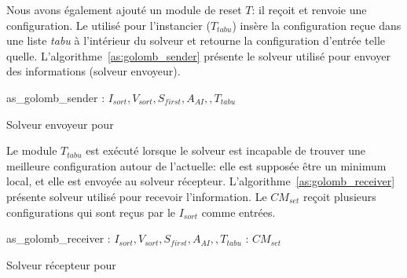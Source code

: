 Nous avons également ajouté un module de reset $T$: il reçoit et renvoie une configuration. Le \om{} utilisé pour l'instancier ($T_{tabu}$) insère la configuration reçue dans une liste \textit{tabu} à l'intérieur du solveur et retourne la configuration d'entrée telle quelle. L'algorithme~\ref{as:golomb_sender} présente le solveur utilisé pour envoyer des informations (solveur envoyeur).

\begin{algorithm}
\dontprintsemicolon
\SetNoline
{}
   as\_golomb\_sender\;
\algoindent{} : $I_{sort}, V_{sort}, S_{first}, A_{AI}, , T_{tabu}$ \; 
\caption{Solveur envoyeur pour  \GRP}\label{as:golomb_sender}
\end{algorithm}

Le module $T_{tabu}$ est exécuté lorsque le solveur est incapable de trouver une meilleure configuration autour de l'actuelle: elle est supposée être un minimum local, et elle est envoyée au solveur récepteur. L'algorithme~\ref{as:golomb_receiver} présente solveur utilisé pour recevoir l'information. Le \opch{} $CM_{set}$ reçoit plusieurs configurations qui sont reçus par le \om{} $I_{sort}$ comme entrées.
 
\begin{algorithm}
\dontprintsemicolon
\SetNoline
{}
   as\_golomb\_receiver\;
\algoindent{} : $I_{sort}, V_{sort}, S_{first}, A_{AI}, , T_{tabu}$ \; 
\algoindent{}: $CM_{set}$\;
\caption{Solveur récepteur pour \GRP}\label{as:golomb_receiver}
\end{algorithm}

